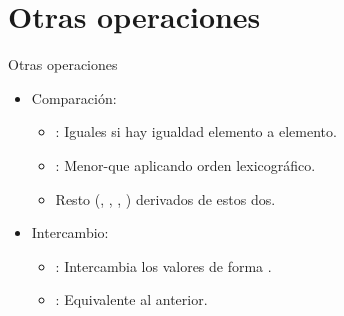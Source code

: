 \section{Otras operaciones}

\begin{frame}[t]{Otras operaciones}
\begin{itemize}
  \item Comparación:
    \begin{itemize}
      \item {}: Iguales si hay igualdad elemento a elemento.
      \item {}: Menor-que aplicando orden lexicográfico.
      \item Resto (\cppid{<=}, \cppid{>}, \cppid{>=}, \cppid{!=}) derivados de estos dos.
    \end{itemize}
  \vfill\pause
  \item Intercambio:
    \begin{itemize}
      \item {}: Intercambia los valores de forma .
      \item {}: Equivalente al anterior.
    \end{itemize}
\end{itemize}
\end{frame}
